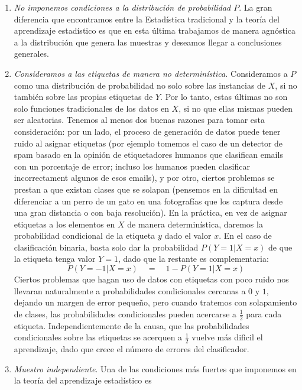 \documentclass{article}
\begin{document}
\begin{enumerate}
    \item \textit{No imponemos condiciones a la distribución de probabilidad $P$}. La gran diferencia que encontramos entre la Estadística
    tradicional y la teoría del aprendizaje estadístico es que en esta última trabajamos de manera agnóstica a la distribución
    que genera las muestras y deseamos llegar a conclusiones generales.
    \item \textit{Consideramos a las etiquetas de manera no determinística.} Consideramos a $P$ como una distribución de probabilidad
    no solo sobre las instancias de $X$, si no también sobre las propias etiquetas de $Y$. Por lo tanto, estas últimas no son solo 
    funciones tradicionales de los datos en $X$, si no que ellas mismas pueden ser aleatorias. Tenemos al menos dos buenas razones
    para tomar esta consideración: por un lado, el proceso de generación de datos puede tener ruido al asignar etiquetas (por ejemplo
    tomemos el caso de un detector de spam basado en la opinión de etiquetadores humanos que clasifican emails con un porcentaje de error; incluso
    los humanos pueden clasificar incorrectament algunos de esos emails), y por otro, ciertos problemas se prestan a que existan
    clases que se solapan (pensemos en la dificultad en diferenciar a un perro de un gato en una fotografías que los captura desde
    una gran distancia o con baja resolución).\newline
    En la práctica, en vez de asignar etiquetas a los elementos en $X$ de manera determinística, daremos la probabilidad condicional
    de la etiqueta $y$ dado el valor $x$. En el caso de clasificación binaria, basta solo dar la probabilidad $P(Y=1|X=x)$ de que la etiqueta
    tenga valor $Y=1$, dado que la restante es complementaria:
    \[
    P(Y=-1|X=x) \quad = \quad 1 - P(Y=1|X=x)
    \]
    Ciertos problemas que hagan uso de datos con etiquetas con poco ruido nos llevaran naturalmente a probabilidades condicionales cercanas
    a $0$ y $1$, dejando un margen de error pequeño, pero cuando tratemos con solapamiento de clases, las probabilidades condicionales
    pueden acercarse a $\frac{1}{2}$ para cada etiqueta. Independientemente de la causa, que las probabilidades condicionales sobre
    las etiquetas se acerquen a $\frac{1}{2}$ vuelve más dificil el aprendizaje, dado que crece el número de errores del clasificador.
    \item \textit{Muestro independiente}. Una de las condiciones más fuertes que imponemos en la teoría del aprendizaje estadístico es

\end{enumerate}
\end{document}
